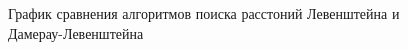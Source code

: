 \begin{figure}[h!]
	
	
	\caption{График сравнения алгоритмов поиска расстоний Левенштейна и Дамерау-Левенштейна}
	
	\label{fig:fig3}
	
\end{figure}
